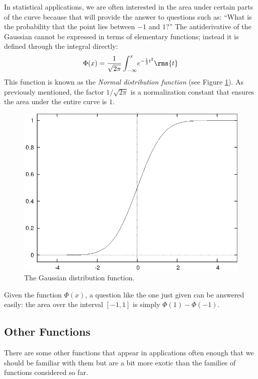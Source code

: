 In statistical applications, we are often interested in the area under
certain parts of the curve because that will provide the answer to
questions such as: ``What is the probability that the point lies
between $-1$ and $1$?''  The antiderivative of the Gaussian cannot be
expressed in terms of elementary functions; instead it is defined
through the integral directly:
%
\[
\Phi(x) = 
  \frac{1}{\sqrt{2 \pi}} 
  \int_{-\infty}^x \! e^{-\frac{1}{2} t^2} \rms{t}
\]
%
This function is known as the \emph{Normal distribution function} 
(see Figure \ref{fig:gausscdf}). As previously mentioned, the factor
$1/\sqrt{2 \pi}$ is a normalization constant that ensures the area
under the entire curve is $1$.

\begin{figure}
  \centerline{\includegraphics{img/gausscdf}}
  \caption{The Gaussian distribution function.}
  \label{fig:gausscdf}
\end{figure}

Given the function $\Phi(x)$, a question like the one just given can
be answered easily: the area over the interval $[-1,1]$ is simply
$\Phi(1) - \Phi(-1)$.

\subsection{Other Functions}

There are some other functions that appear in applications often
enough that we should be familiar with them but are a bit more exotic
than the families of functions considered so far.

